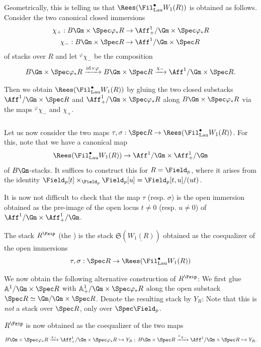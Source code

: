 \documentclass[10pt]{amsart}
\begin{document}
Geometrically, this is telling us that $\Rees(\Fil^\bullet_{\mathrm{Lau}}W_1(R))$ is obtained as follows. Consider the two canonical closed immersions
\begin{align}\label{eqn:lambda_maps}
\chi_+:B\Gm\times\Spec \varphi_*R&\to \Aff^1_+/\Gm\times\Spec \varphi_*R \\
\chi_-:B\Gm\times\Spec R&\to \Aff^1/\Gm\times\Spec R
\end{align}
of stacks over $R$ and let ${}^\varphi\chi_-$ be the composition
\[
B\Gm\times\Spec \varphi_*R\xrightarrow{\mathrm{id}\times\varphi}B\Gm\times\Spec R\xrightarrow{\chi_-}\Aff^1/\Gm\times\Spec R.
\]

Then we obtain $\Rees(\Fil^\bullet_{\mathrm{Lau}}W_1(R))$ by gluing the two closed substacks $\Aff^1/\Gm\times\Spec R$ and $\Aff^1_+/\Gm\times\Spec \varphi_*R$ along $B\Gm\times \Spec \varphi_*R$ via the maps ${}^\varphi\chi_-$ and $\chi_+$. 


\subsubsection{}
Let us now consider the two maps $\tau,\sigma:\Spec R \to \Rees(\Fil^\bullet_{\mathrm{Lau}}W_1(R))$. For this, note that we have a canonical map
\[
\Rees(\Fil^\bullet_{\mathrm{Lau}}W_1(R))\to \Aff^1/\Gm\times \Aff^1_+/\Gm
\]
of $B\Gm$-stacks. It suffices to construct this for $R = \Field_p$, where it arises from the identity $\Field_p[t]\times_{\Field_p}\Field_p[u] = \Field_p[t,u]/(ut)$.

It is now not difficult to check that the map $\tau$ (resp. $\sigma$) is the open immersion obtained as the pre-image of the open locus $t\neq 0$ (resp. $u\neq 0$) of $\Aff^1/\Gm\times \Aff^1_+/\Gm$.

\begin{definition}
The stack $R^{\Fzip}$ (the ) is the stack $\mathfrak{S}(\underline{W_1(R)})$ obtained as the coequalizer of the open immersions
\[
\tau,\sigma:\Spec R \to \Rees(\Fil^\bullet_{\mathrm{Lau}}W_1(R))
\]
\end{definition}




\begin{remark}
\label{rem:fzip_stack_alternate}
We now obtain the following alternative construction of $R^{\Fzip}$: We first glue $\mathbb{A}^1/\Gm\times \Spec R$ with $\mathbb{A}^1_+/\Gm\times \Spec \varphi_*R$ along the open substack $\Spec R\simeq \Gm/\Gm\times \Spec R$. Denote the resulting stack by $Y_R$: Note that this is \emph{not} a stack over $\Spec R$, only over $\Spec \Field_p$. 

$R^{\Fzip}$ is now obtained as the coequalizer of the two maps 
\[
B\Gm\times\Spec \varphi_*R\xrightarrow{\chi_+}\Aff^1_+/\Gm\times\Spec \varphi_*R\hookrightarrow Y_R\;;\; B\Gm\times\Spec R\xrightarrow{{}^\varphi\chi_-}\Aff^1/\Gm\times\Spec R\hookrightarrow Y_R.
\]
\end{remark}
\end{document}
